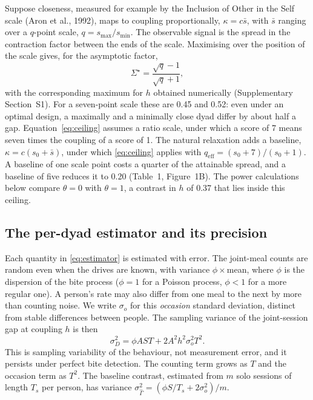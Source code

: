 \documentclass[12pt]{article}
\begin{document}
Suppose closeness, measured for example by the Inclusion of Other in the Self
scale (Aron et al., 1992), maps to coupling proportionally,
$\kappa=c\bar s$, with $\bar s$ ranging over a $q$-point scale,
$q=s_{\max}/s_{\min}$. The observable signal is the spread in the contraction
factor between the ends of the scale. Maximising over the position of the scale
gives, for the asymptotic factor,
\begin{equation}\label{eq:ceiling}
\Sigma^\star=\frac{\sqrt q-1}{\sqrt q+1},
\end{equation}
with the corresponding maximum for $h$ obtained numerically (Supplementary
Section~S1). For a seven-point scale these are 0.45 and 0.52: even under an
optimal design, a maximally and a minimally close dyad differ by about half a gap.
Equation~\eqref{eq:ceiling} assumes a ratio scale, under which a score of 7 means
seven times the coupling of a score of 1. The natural relaxation adds a baseline,
$\kappa=c(s_0+\bar s)$, under which \eqref{eq:ceiling} applies with
$q_{\mathrm{eff}}=(s_0+7)/(s_0+1)$. A baseline of one scale point costs a quarter
of the attainable spread, and a baseline of five reduces it to 0.20 (Table~1,
Figure~1B). The power calculations below compare $\theta=0$ with $\theta=1$, a
contrast in $h$ of 0.37 that lies inside this ceiling.

\subsection*{The per-dyad estimator and its precision}

Each quantity in \eqref{eq:estimator} is estimated with error. The joint-meal
counts are random even when the drives are known, with variance
$\phi\times$mean, where $\phi$ is the dispersion of the bite process ($\phi=1$
for a Poisson process, $\phi<1$ for a more regular one). A person's rate may also
differ from one meal to the next by more than counting noise. We write
$\sigma_o$ for this \emph{occasion} standard deviation, distinct from stable
differences between people. The sampling variance of the joint-session gap at
coupling $h$ is then
\begin{equation}\label{eq:gapvar}
\sigma_D^2=\phi A S T+2A^2h^2\sigma_o^2T^2 .
\end{equation}
This is sampling variability of the behaviour, not measurement error, and it
persists under perfect bite detection. The counting term grows as $T$ and the
occasion term as $T^2$. The baseline contrast, estimated from $m$ solo sessions of
length $T_s$ per person, has variance
$\sigma_{\hat\Gamma}^2=(\phi S/T_s+2\sigma_o^2)/m$.
\end{document}
